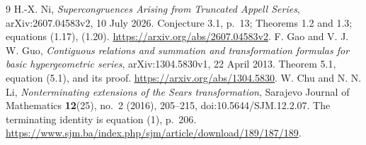 \documentclass[11pt]{article}
\begin{document}
\begin{thebibliography}{9}
 H.-X. Ni, \emph{Supercongruences Arising from Truncated Appell
Series}, arXiv:2607.04583v2, 10 July 2026. Conjecture 3.1, p.~13;
Theorems 1.2 and 1.3; equations (1.17), (1.20).
\url{https://arxiv.org/abs/2607.04583v2}.
 F. Gao and V. J. W. Guo, \emph{Contiguous relations and
summation and transformation formulas for basic hypergeometric series},
arXiv:1304.5830v1, 22 April 2013. Theorem 5.1, equation (5.1), and its proof.
\url{https://arxiv.org/abs/1304.5830}.
 W. Chu and N. N. Li, \emph{Nonterminating extensions of the
Sears transformation}, Sarajevo Journal of Mathematics \textbf{12}(25),
no.~2 (2016), 205--215, doi:10.5644/SJM.12.2.07.
The terminating identity is equation (1), p.~206.
\url{https://www.sjm.ba/index.php/sjm/article/download/189/187/189}.
\end{thebibliography}
\end{document}
